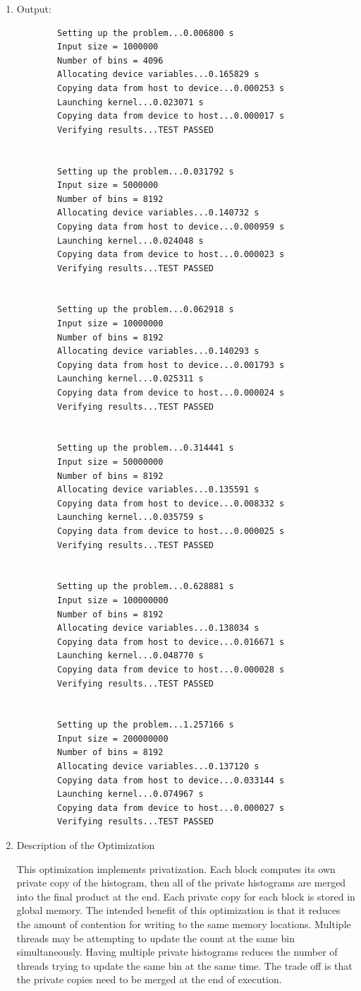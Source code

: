 \documentclass{article}
\begin{document}
\begin{enumerate}
	\item Output:
	\begin{verbatim}
		Setting up the problem...0.006800 s
		Input size = 1000000
		Number of bins = 4096
		Allocating device variables...0.165829 s
		Copying data from host to device...0.000253 s
		Launching kernel...0.023071 s
		Copying data from device to host...0.000017 s
		Verifying results...TEST PASSED
		
		
		Setting up the problem...0.031792 s
		Input size = 5000000
		Number of bins = 8192
		Allocating device variables...0.140732 s
		Copying data from host to device...0.000959 s
		Launching kernel...0.024048 s
		Copying data from device to host...0.000023 s
		Verifying results...TEST PASSED
		
		
		Setting up the problem...0.062918 s
		Input size = 10000000
		Number of bins = 8192
		Allocating device variables...0.140293 s
		Copying data from host to device...0.001793 s
		Launching kernel...0.025311 s
		Copying data from device to host...0.000024 s
		Verifying results...TEST PASSED
		
		
		Setting up the problem...0.314441 s
		Input size = 50000000
		Number of bins = 8192
		Allocating device variables...0.135591 s
		Copying data from host to device...0.008332 s
		Launching kernel...0.035759 s
		Copying data from device to host...0.000025 s
		Verifying results...TEST PASSED
		
		
		Setting up the problem...0.628881 s
		Input size = 100000000
		Number of bins = 8192
		Allocating device variables...0.138034 s
		Copying data from host to device...0.016671 s
		Launching kernel...0.048770 s
		Copying data from device to host...0.000028 s
		Verifying results...TEST PASSED
		
		
		Setting up the problem...1.257166 s
		Input size = 200000000
		Number of bins = 8192
		Allocating device variables...0.137120 s
		Copying data from host to device...0.033144 s
		Launching kernel...0.074967 s
		Copying data from device to host...0.000027 s
		Verifying results...TEST PASSED
	\end{verbatim}
	
	\item Description of the Optimization
	
	This optimization implements privatization. Each block computes its own private copy of the histogram, then all of the private histograms are merged into the final product at the end. Each private copy for each block is stored in global memory. The intended benefit of this optimization is that it reduces the amount of contention for writing to the same memory locations. Multiple threads may be attempting to update the count at the same bin simultaneously. Having multiple private histograms reduces the number of threads trying to update the same bin at the same time. The trade off is that the private copies need to be merged at the end of execution.
	

\end{enumerate}
\end{document}
